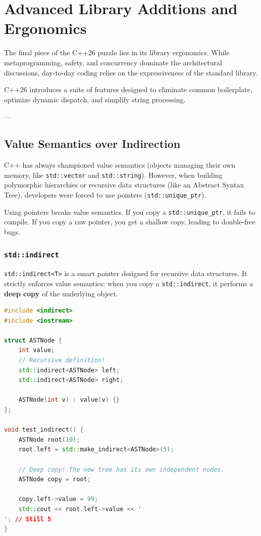 \chapter{Advanced Library Additions and Ergonomics}

The final piece of the C++26 puzzle lies in its library ergonomics. While metaprogramming, safety, and concurrency dominate the architectural discussions, day-to-day coding relies on the expressiveness of the standard library.

C++26 introduces a suite of features designed to eliminate common boilerplate, optimize dynamic dispatch, and simplify string processing. 

---

\section{Value Semantics over Indirection}

C++ has always championed value semantics (objects managing their own memory, like \texttt{std::vector} and \texttt{std::string}). However, when building polymorphic hierarchies or recursive data structures (like an Abstract Syntax Tree), developers were forced to use pointers (\texttt{std::unique_ptr}).

Using pointers breaks value semantics. If you copy a \texttt{std::unique_ptr}, it fails to compile. If you copy a raw pointer, you get a shallow copy, leading to double-free bugs.

\subsection{\texttt{std::indirect}}

\texttt{std::indirect<T>} is a smart pointer designed for recursive data structures. It strictly enforces value semantics: when you copy a \texttt{std::indirect}, it performs a \textbf{deep copy} of the underlying object.

\begin{lstlisting}[language=C++]
#include <indirect>
#include <iostream>

struct ASTNode {
    int value;
    // Recursive definition!
    std::indirect<ASTNode> left;
    std::indirect<ASTNode> right;
    
    ASTNode(int v) : value(v) {}
};

void test_indirect() {
    ASTNode root(10);
    root.left = std::make_indirect<ASTNode>(5);
    
    // Deep copy! The new tree has its own independent nodes.
    ASTNode copy = root; 
    
    copy.left->value = 99;
    std::cout << root.left->value << '
'; // Still 5
}
\end{lstlisting}

